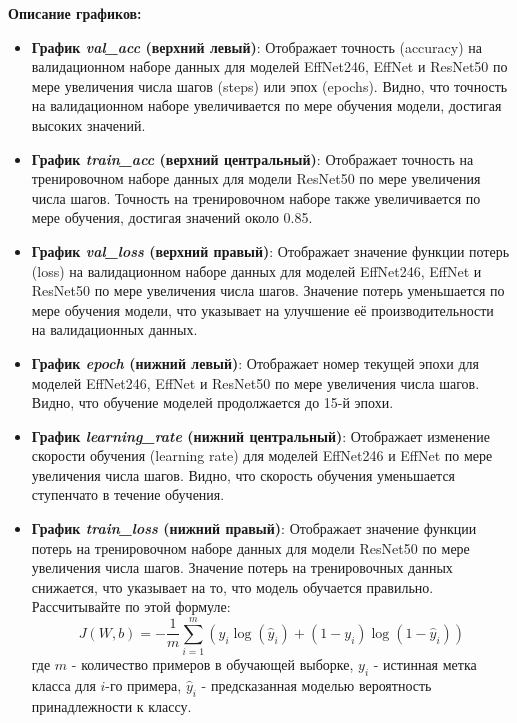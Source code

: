 \documentclass[14pt]{extarticle}
\begin{document}
\textbf{Описание графиков:}

\begin{itemize}
    \item \textbf{График \textit{val\_acc} (верхний левый)}: Отображает точность (accuracy) на валидационном наборе данных для моделей EffNet246, EffNet и ResNet50 по мере увеличения числа шагов (steps) или эпох (epochs). Видно, что точность на валидационном наборе увеличивается по мере обучения модели, достигая высоких значений.
    \item \textbf{График \textit{train\_acc} (верхний центральный)}: Отображает точность на тренировочном наборе данных для модели ResNet50 по мере увеличения числа шагов. Точность на тренировочном наборе также увеличивается по мере обучения, достигая значений около 0.85.
    \item \textbf{График \textit{val\_loss} (верхний правый)}: Отображает значение функции потерь (loss) на валидационном наборе данных для моделей EffNet246, EffNet и ResNet50 по мере увеличения числа шагов. Значение потерь уменьшается по мере обучения модели, что указывает на улучшение её производительности на валидационных данных.
    \item \textbf{График \textit{epoch} (нижний левый)}: Отображает номер текущей эпохи для моделей EffNet246, EffNet и ResNet50 по мере увеличения числа шагов. Видно, что обучение моделей продолжается до 15-й эпохи.
    \item \textbf{График \textit{learning\_rate} (нижний центральный)}: Отображает изменение скорости обучения (learning rate) для моделей EffNet246 и EffNet по мере увеличения числа шагов. Видно, что скорость обучения уменьшается ступенчато в течение обучения.
    \item \textbf{График \textit{train\_loss} (нижний правый)}: Отображает значение функции потерь на тренировочном наборе данных для модели ResNet50 по мере увеличения числа шагов. Значение потерь на тренировочных данных снижается, что указывает на то, что модель обучается правильно. Рассчитывайте по этой формуле:
\[
J(W, b) = -\frac{1}{m} \sum_{i=1}^{m} \left( y_i \log(\hat{y}_i) + (1-y_i) \log(1-\hat{y}_i) \right)
\]
где \( m \) - количество примеров в обучающей выборке, \( y_i \) - истинная метка класса для \( i \)-го примера, \( \hat{y}_i \) - предсказанная моделью вероятность принадлежности к классу.

\end{itemize}
\end{document}
